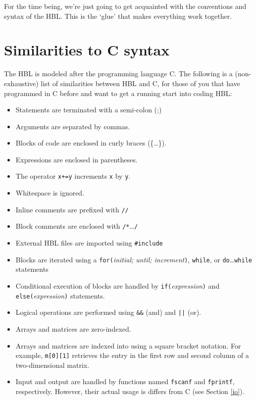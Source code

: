 \documentclass[12pt]{book}
\begin{document}
 For the time being, we're just going to get acquainted with the conventions and syntax of the HBL.  This is the `glue' that makes everything work together.


\section {Similarities to C syntax}

The HBL is modeled after the programming language C.  The following is a (non-exhaustive) list of similarities between HBL and C, for those of you that have programmed in C before and want to get a running start into coding HBL:

\begin{itemize}
\item Statements are terminated with a semi-colon (;) 
\item Arguments are separated by commas.
\item Blocks of code are enclosed in curly braces (\{\ldots\}). 
\item Expressions are enclosed in parentheses.
\item The operator {\tt x+=y} increments {\tt x} by {\tt y}.
\item Whitespace is ignored.
\item Inline comments are prefixed with {\tt //}
\item Block comments are enclosed with {\tt /*}\ldots{\tt */}
\item External HBL files are imported using {\tt \#include}
\item Blocks are iterated using a {\tt for(}{\it initial; until; increment}{\tt )}, {\tt while}, or {\tt do}\ldots{\tt while} statements
\item Conditional execution of blocks are handled by {\tt if(}{\it expression}{\tt )} and {\tt else(}{\it expression}{\tt )} statements.
\item Logical operations are performed using {\tt \&\&} (and) and {\tt ||} (or).
\item Arrays and matrices are zero-indexed.
\item Arrays and matrices are indexed into using a square bracket notation.  For example, {\tt m[0][1]} retrieves the entry in the first row and second column of a two-dimensional matrix.
\item Input and output are handled by functions named {\tt fscanf} and {\tt fprintf}, respectively.  However, their actual usage is differs from C (see Section \ref{io}).
\end{itemize}
\end{document}
